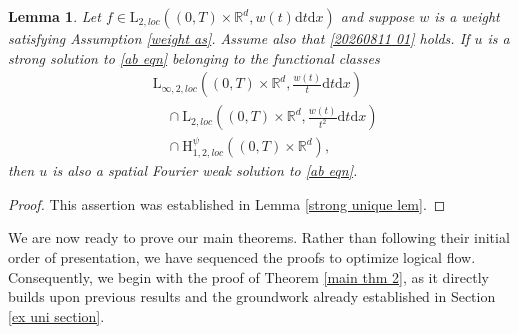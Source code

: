 \documentclass[11pt,reqno]{amsart}
\newtheorem{lem}[thm]{Lemma}
\theoremstyle{definition}
\theoremstyle{remark}
\newcommand\bR{\mathbb{R}}
\numberwithin{equation}{section}
\begin{document}
\begin{lem}
										\label{inculsuion solutions lemma}
Let $f \in \mathrm{L}_{2,loc}((0,T) \times \bR^d, w(t)\mathrm{d}t\mathrm{d}x)$ and suppose $w$ is a weight satisfying Assumption \ref{weight as}. Assume also that \eqref{20260811 01} holds.
If $u$ is a strong solution to \eqref{ab eqn} belonging to the functional classes
$$
\begin{aligned}
&\mathrm{L}_{\infty,2, loc}\left( (0,T) \times \bR^d ,\frac{w(t)}{t}\mathrm{d}t \mathrm{d}x\right)\\
&\quad\cap \mathrm{L}_{2, loc}\left( (0,T) \times \bR^d,\frac{w(t)}{t^2}\mathrm{d}t\mathrm{d}x \right)\\
&\quad\cap \mathrm{H}_{1,2,loc}^{\psi}\left( (0,T) \times \bR^d\right),
\end{aligned}
$$
then $u$ is also a spatial Fourier weak solution to \eqref{ab eqn}.
\end{lem}
\begin{proof}
This assertion was established in Lemma \ref{strong unique lem}.
\end{proof}



We are now ready to prove our main theorems. Rather than following their initial order of presentation, we have sequenced the proofs to optimize logical flow. 
Consequently, we begin with the proof of Theorem \ref{main thm 2}, as it directly builds upon previous results and the groundwork already established in Section \ref{ex uni section}.
\end{document}
